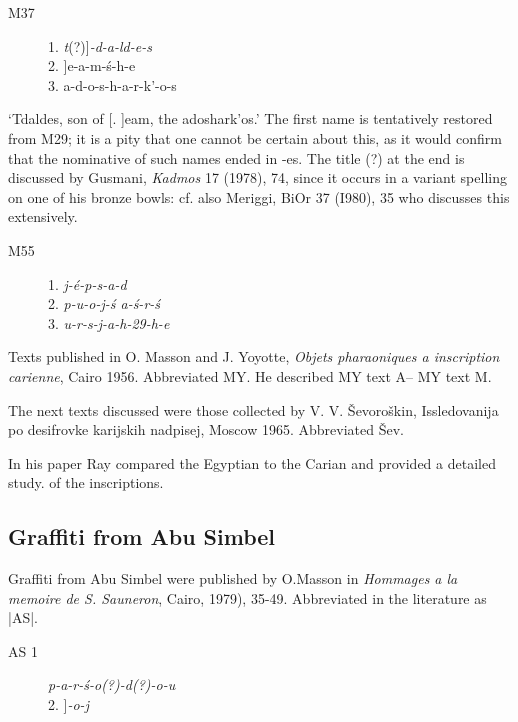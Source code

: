\begin{description}
\item[M37] 1. \textit{t}(?)]\textit{-d-a-ld-e-s}\\
2. ]e-a-m-\'s-h-e\\
3. a-d-o-s-h-a-r-k'-o-s \\
\end{description}

`Tdaldes, son of [. ]eam, the adoshark'os.' The first name is tentatively restored from M29; it is a
pity that one cannot be certain about this, as it would confirm that the nominative of such names
ended in -es. The title (?) at the end is discussed by Gusmani, \textit{Kadmos} 17 (1978), 74, since it occurs
in a variant spelling on one of his bronze bowls: cf. also Meriggi, BiOr 37 (I980), 35 who discusses this extensively. 


\begin{description}
\item[M55] 1. \textit{j-\'e-p-s-a-d}\\
           2. \textit{p-u-o-j-\'s a-\'s-r-\'s}\\
           3. \textit{u-r-s-j-a-h-29-h-e} 
\end{description}



Texts published in O. Masson and J. Yoyotte, \textit{Objets pharaoniques a inscription
carienne}, Cairo 1956. Abbreviated MY. He described MY text A-- MY text M. 

The next texts discussed were those collected by V. V. \v{S}evoro\v{s}kin, Issledovanija po desifrovke karijskih nadpisej,
Moscow 1965. Abbreviated \v{S}ev.

In his paper Ray compared the Egyptian to the Carian and provided a detailed study.
of the inscriptions.

\subsection{Graffiti from Abu Simbel}

Graffiti from Abu Simbel were published by O.Masson in \textit{Hommages a la memoire de
S. Sauneron}, Cairo, 1979), 35-49. Abbreviated in the literature as |AS|. 

\begin{description}
\item[AS 1] \textit{p-a-r-\'s-o(?)-d(?)-o-u}\\
   2. ]\textit{-o-j}
\end{description}

